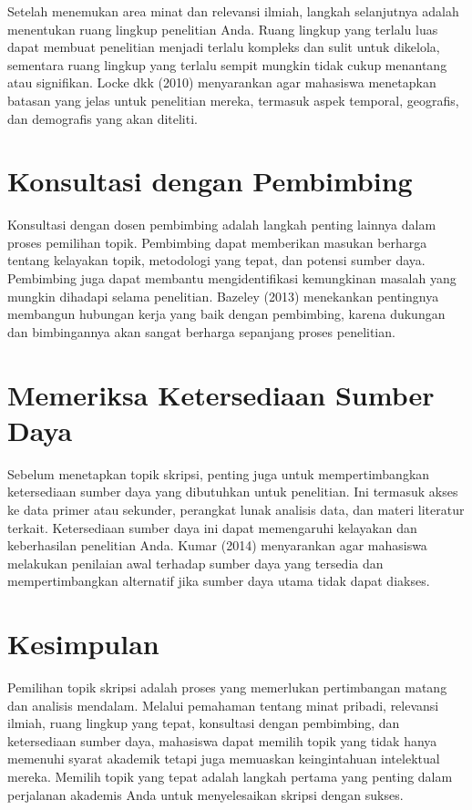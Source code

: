 \documentclass[
  indonesian,
  letterpaper,
]{scrbook}
\begin{document}
Setelah menemukan area minat dan relevansi ilmiah, langkah selanjutnya
adalah menentukan ruang lingkup penelitian Anda. Ruang lingkup yang
terlalu luas dapat membuat penelitian menjadi terlalu kompleks dan sulit
untuk dikelola, sementara ruang lingkup yang terlalu sempit mungkin
tidak cukup menantang atau signifikan. Locke dkk (2010) menyarankan agar
mahasiswa menetapkan batasan yang jelas untuk penelitian mereka,
termasuk aspek temporal, geografis, dan demografis yang akan diteliti.

\section{Konsultasi dengan
Pembimbing}\label{konsultasi-dengan-pembimbing}

Konsultasi dengan dosen pembimbing adalah langkah penting lainnya dalam
proses pemilihan topik. Pembimbing dapat memberikan masukan berharga
tentang kelayakan topik, metodologi yang tepat, dan potensi sumber daya.
Pembimbing juga dapat membantu mengidentifikasi kemungkinan masalah yang
mungkin dihadapi selama penelitian. Bazeley (2013) menekankan pentingnya
membangun hubungan kerja yang baik dengan pembimbing, karena dukungan
dan bimbingannya akan sangat berharga sepanjang proses penelitian.

\section{Memeriksa Ketersediaan Sumber
Daya}\label{memeriksa-ketersediaan-sumber-daya}

Sebelum menetapkan topik skripsi, penting juga untuk mempertimbangkan
ketersediaan sumber daya yang dibutuhkan untuk penelitian. Ini termasuk
akses ke data primer atau sekunder, perangkat lunak analisis data, dan
materi literatur terkait. Ketersediaan sumber daya ini dapat memengaruhi
kelayakan dan keberhasilan penelitian Anda. Kumar (2014) menyarankan
agar mahasiswa melakukan penilaian awal terhadap sumber daya yang
tersedia dan mempertimbangkan alternatif jika sumber daya utama tidak
dapat diakses.

\section*{Kesimpulan}\label{kesimpulan-1}


Pemilihan topik skripsi adalah proses yang memerlukan pertimbangan
matang dan analisis mendalam. Melalui pemahaman tentang minat pribadi,
relevansi ilmiah, ruang lingkup yang tepat, konsultasi dengan
pembimbing, dan ketersediaan sumber daya, mahasiswa dapat memilih topik
yang tidak hanya memenuhi syarat akademik tetapi juga memuaskan
keingintahuan intelektual mereka. Memilih topik yang tepat adalah
langkah pertama yang penting dalam perjalanan akademis Anda untuk
menyelesaikan skripsi dengan sukses.
\end{document}
